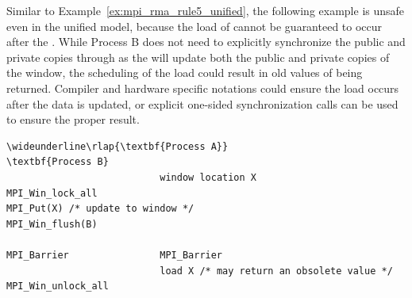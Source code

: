 \begin{example}
%
Similar to Example~\ref{ex:mpi_rma_rule5_unified}, the following example
is unsafe even in the unified model, because the load of  cannot be
guaranteed to occur after the .  While Process B
does not need to explicitly synchronize the public and private copies
through  as the  will update
 both the public and private copies of the window, the scheduling of
the load could result in old values of  being returned.  Compiler and hardware
specific notations could ensure the load occurs after the data is updated, or 
explicit one-sided synchronization calls can be used to ensure the proper result.

\begin{Verbatim}[commandchars=\\\{\}]
\wideunderline\rlap{\textbf{Process A}}                           \textbf{Process B}
                           window location X
MPI_Win_lock_all
MPI_Put(X) /* update to window */
MPI_Win_flush(B)

MPI_Barrier                MPI_Barrier
                           load X /* may return an obsolete value */
MPI_Win_unlock_all
\end{Verbatim}
\lstset{fancyvrb=false}
\end{example}

